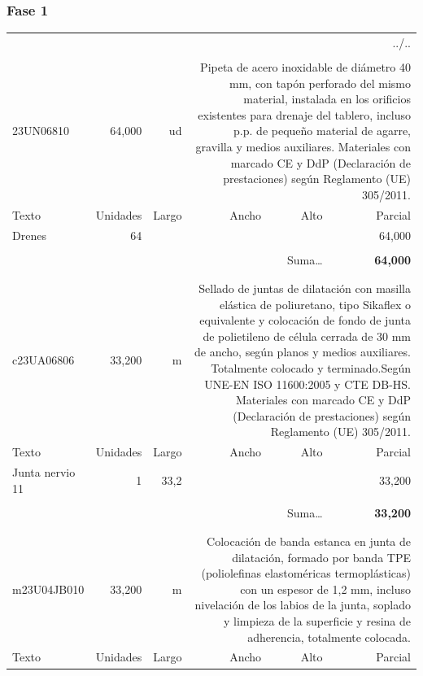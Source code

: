 \documentclass{book}%
\begin{document}
\subsubsection{Fase 1}%
\begin{longtable}{lrrrrr}%
\multicolumn{6}{r}{../..}\\%
\endfoot%
\endlastfoot%
&&&&&\\%
23UN06810&    64,000& ud&\multicolumn{3}{p{6cm}}{\scriptsize Pipeta de acero inoxidable de diámetro 40 mm, con tapón perforado del mismo material, instalada en los orificios existentes para drenaje del tablero, incluso p.p. de pequeño material de agarre, gravilla y medios auxiliares. Materiales con marcado CE y DdP (Declaración de prestaciones) según Reglamento (UE) 305/2011.\normalsize}\\%
Texto&Unidades&Largo&Ancho&Alto&Parcial\\%
\hline%
\multicolumn{1}{p{3.5cm}}{Drenes}&64&&&&    64,000\\%
&&&&&\\%
\multicolumn{5}{r}{Suma\ldots}&\textbf{    64,000}\\%
\hline%
&&&&&\\%
&&&&&\\%
c23UA06806&    33,200& m&\multicolumn{3}{p{6cm}}{\scriptsize Sellado de juntas de dilatación con masilla elástica de poliuretano, tipo Sikaflex o equivalente y colocación de fondo de junta de polietileno de célula cerrada de 30 mm de ancho, según planos y medios auxiliares. Totalmente colocado y terminado.Según UNE-EN ISO 11600:2005 y CTE DB-HS. Materiales con marcado CE y DdP (Declaración de prestaciones) según Reglamento (UE) 305/2011.\normalsize}\\%
Texto&Unidades&Largo&Ancho&Alto&Parcial\\%
\hline%
\multicolumn{1}{p{3.5cm}}{Junta nervio 11}&1&33,2&&&    33,200\\%
&&&&&\\%
\multicolumn{5}{r}{Suma\ldots}&\textbf{    33,200}\\%
\hline%
&&&&&\\%
&&&&&\\%
m23U04JB010&    33,200& m&\multicolumn{3}{p{6cm}}{\scriptsize Colocación de banda estanca en junta de dilatación, formado por banda TPE (poliolefinas elastoméricas termoplásticas) con un espesor de 1,2 mm, incluso nivelación de los labios de la junta, soplado y limpieza de la superficie y resina de adherencia, totalmente colocada.\normalsize}\\%
Texto&Unidades&Largo&Ancho&Alto&Parcial\\%

\end{longtable}
\end{document}

